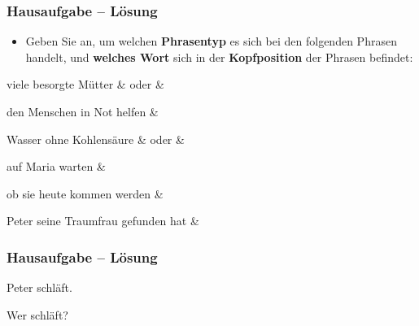 

\begin{frame}
\frametitle{Hausaufgabe -- Lösung}

\begin{itemize}
	\item Geben Sie an, um welchen \textbf{Phrasentyp} es sich bei den folgenden Phrasen handelt, und \textbf{welches Wort} sich in der \textbf{Kopfposition} der Phrasen befindet:
\end{itemize}	

\eal
	\ex viele besorgte Mütter  \pause \hfill {} \&  oder  \&  \pause 

	\ex den Menschen in Not helfen \pause \hfill {} \&  \pause 
	
	\ex Wasser ohne Kohlensäure \pause \hfill {} \&  oder \alertgreen{$\emptyset$} \&  \pause 
	
	\ex auf Maria warten \pause \hfill {} \&  \pause 
	
	\ex ob sie heute kommen werden \pause \hfill {} \&  \pause 
	
	\ex Peter seine Traumfrau gefunden hat \pause \hfill {} \& 
\zl

\end{frame}


\begin{frame}
\frametitle{Hausaufgabe -- Lösung}

\begin{minipage}[b]{0.45\textwidth}
	
	{\small Peter schläft.}
	
	\pause
	
	\centering
\end{minipage}  
%            
%         
\begin{minipage}[b]{0.45\textwidth}
	
	\pause 
	
	{\small Wer schläft?}	
	
	\pause 
	
	\centering
\end{minipage}  

\end{frame}


